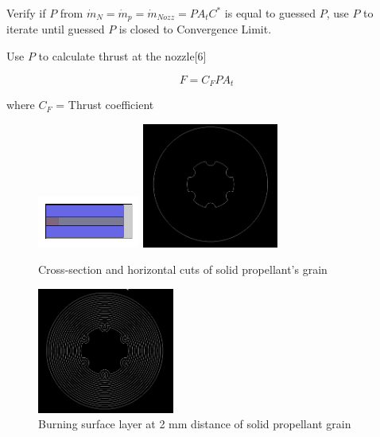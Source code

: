\documentclass[conference]{IEEEtran}
\begin{document}
Verify if $P$ from $\dot{m}_{N} = \dot{m}_{p}= \dot{m}_{Nozz}= P{A}_tC^{*}$ is equal to guessed $P$, use $P$ to iterate until guessed $P$ is closed to Convergence Limit.

Use $P$ to calculate thrust at the nozzle[6] 
	
\begin{center}
\begin{equation}
F={C}_FP{A}_t
\end{equation}
\end{center}
where ${C}_F$ = Thrust coefficient


\begin{figure}[t]
\centering
\includegraphics[width=0.3\textwidth]{horizontal_cut}
\includegraphics[width=0.4\textwidth]{cross_section}
\caption{Cross-section and horizontal cuts of solid propellant's grain}
\label{fig:1}
\end{figure}

\begin{figure}[t]
\centering
\includegraphics[width=0.4\textwidth]{burnlayer}
\caption{Burning surface layer at 2 mm distance of solid propellant grain}
\label{fig:2}
\end{figure}
\end{document}
